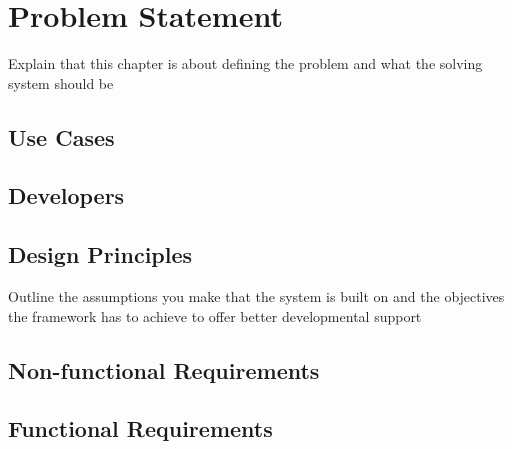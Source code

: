 \chapter{Problem Statement}
Explain that this chapter is about defining the problem and what the solving system should be

\section{Use Cases}

\section{Developers}

\section{Design Principles}

Outline the assumptions you make that the system is built on and the objectives the framework has to achieve to offer better developmental support

\section{Non-functional Requirements}

\section{Functional Requirements}
